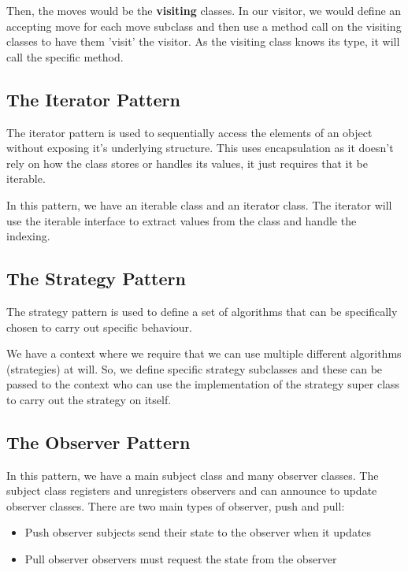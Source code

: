 \documentclass[a4paper, 12pt, twoside]{article}
\begin{document}
\vspace{\baselineskip}

Then, the moves would be the \textbf{visiting} classes. In our
visitor, we would define an accepting move for each move subclass
and then use a method call on the visiting classes to have them
'visit' the visitor. As the visiting class knows its type, it will
call the specific method.

\subsection{The Iterator Pattern}

The iterator pattern is used to sequentially access the
elements of an object without exposing it's underlying structure.
This uses encapsulation as it doesn't rely on how the class
stores or handles its values, it just requires that it be
iterable.

\vspace{\baselineskip}

In this pattern, we have an iterable class and an iterator class.
The iterator will use the iterable interface to extract values
from the class and handle the indexing.

\newpage

\subsection{The Strategy Pattern}

The strategy pattern is used to define a set of algorithms that
can be specifically chosen to carry out specific behaviour.

\vspace{\baselineskip}

We have a context where we require that we can use multiple different
algorithms (strategies) at will. So, we define specific strategy
subclasses and these can be passed to the context who can
use the implementation of the strategy super class to carry
out the strategy on itself.

\subsection{The Observer Pattern}

In this pattern, we have a main subject class and
many observer classes. The subject class registers and
unregisters observers and can announce to update observer classes.
There are two main types of observer, push and pull:
\begin{itemize}
    \item Push observer subjects send their state to the observer when
    it updates
    \item Pull observer observers must request the state from the 
    observer    
\end{itemize}
\end{document}
